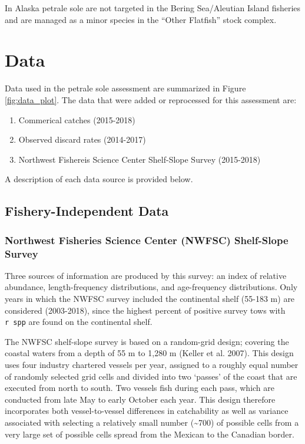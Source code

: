\documentclass[12pt,]{article}
\begin{document}
In Alaska petrale sole are not targeted in the Bering Sea/Aleutian
Island fisheries and are managed as a minor species in the ``Other
Flatfish'' stock complex.

\section{Data}\label{data}

Data used in the petrale sole assessment are summarized in Figure
\ref{fig:data_plot}. The data that were added or reprocessed for this
assessment are:

\begin{enumerate}
  \item Commerical catches (2015-2018)
  \item Observed discard rates (2014-2017)
  \item Northwest Fishereis Science Center Shelf-Slope Survey (2015-2018)
\end{enumerate}

A description of each data source is provided below.

\subsection{Fishery-Independent Data}\label{fishery-independent-data}

\subsubsection{Northwest Fisheries Science Center (NWFSC) Shelf-Slope
Survey}\label{northwest-fisheries-science-center-nwfsc-shelf-slope-survey}

Three sources of information are produced by this survey: an index of
relative abundance, length-frequency distributions, and age-frequency
distributions. Only years in which the NWFSC survey included the
continental shelf (55-183 m) are considered (2003-2018), since the
highest percent of positive survey tows with \texttt{r\ spp} are found
on the continental shelf.

The NWFSC shelf-slope survey is based on a random-grid design; covering
the coastal waters from a depth of 55 m to 1,280 m (Keller et al. 2007).
This design uses four industry chartered vessels per year, assigned to a
roughly equal number of randomly selected grid cells and divided into
two `passes' of the coast that are executed from north to south. Two
vessels fish during each pass, which are conducted from late May to
early October each year. This design therefore incorporates both
vessel-to-vessel differences in catchability as well as variance
associated with selecting a relatively small number
(\textasciitilde{}700) of possible cells from a very large set of
possible cells spread from the Mexican to the Canadian border.
\end{document}
